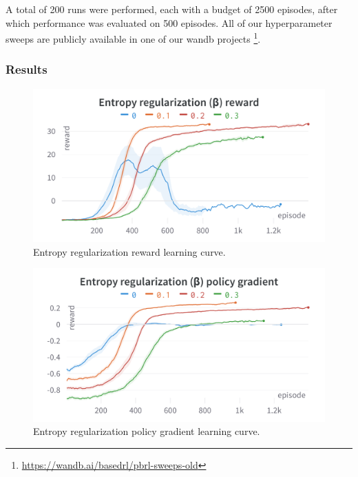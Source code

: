 \documentclass{article}
\begin{document}
A total of 200 runs were performed, each with a budget of 2500 episodes, after which performance was evaluated on 500 episodes.
All of our hyperparameter sweeps are publicly available in one of our wandb projects \footnote{\url{https://wandb.ai/basedrl/pbrl-sweeps-old}}.

\subsubsection{Results}
\label{R-Results}

\begin{figure}[htbp]
    \centering
    \includegraphics[width=\linewidth]{figs/ER-R.png}
    \caption{Entropy regularization reward learning curve.}
    \label{fig:er-r}
\end{figure}

\begin{figure}[htbp]
    \centering
    \includegraphics[width=\linewidth]{figs/ER-PG.png}
    \caption{Entropy regularization policy gradient learning curve.}
    \label{fig:er-pg}
\end{figure}


\end{document}
